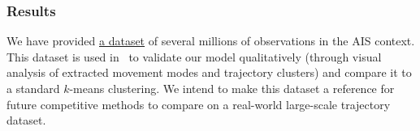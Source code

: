 \subsubsection{Results}

We have provided \href{https://github.com/rtavenar/ushant_ais}{a dataset} of
several
millions of observations in the AIS context.
This dataset is used in~\cite{gloaguen2020} to validate our model qualitatively
(through visual
analysis of extracted movement modes and trajectory clusters) and compare it to
a standard $k$-means clustering.
We intend to make this dataset a reference for future competitive methods to
compare on a
real-world large-scale trajectory dataset.
